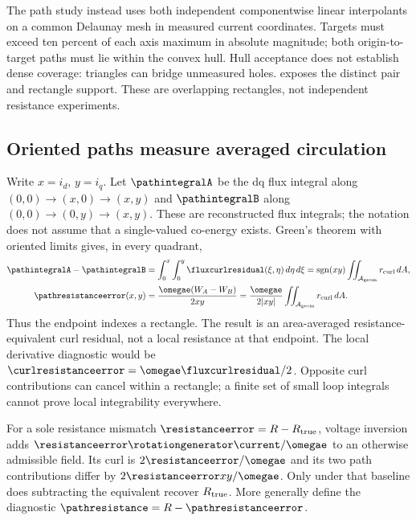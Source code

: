 The path study instead uses both independent componentwise linear
interpolants on a common Delaunay mesh in measured current coordinates.
Targets must exceed ten percent of each axis maximum in absolute magnitude;
both origin-to-target paths must lie within the convex hull. Hull acceptance
does not establish dense coverage: triangles can bridge unmeasured holes.
 exposes the distinct pair and rectangle support.
These are overlapping rectangles, not independent resistance experiments.
\begin{table}[tb]
\centering\small

\caption{Unchanged audit support. Speed $n$ is in rpm and rotor reference in
$^\circ$C. Skips count hull failures after the axis threshold: 2871 candidate
targets per 2000-rpm slice and 69 per multi-speed slice. OP means
operating-index groups, not raw samples.}
\label{tab:audit-support}
\end{table}

\subsection{Oriented paths measure averaged circulation}
Write $x=i_d$, $y=i_q$. Let $\pathintegralA$ be the dq flux integral along
$(0,0)\to(x,0)\to(x,y)$ and $\pathintegralB$ along
$(0,0)\to(0,y)\to(x,y)$. These are reconstructed flux integrals; the notation
does not assume that a single-valued co-energy exists. Green's theorem with
oriented limits gives, in every quadrant,
\begin{align}
 \pathintegralA-\pathintegralB
 &=\int_0^x\int_0^y \fluxcurlresidual(\xi,\eta)\,d\eta\,d\xi
   =\operatorname{sgn}(xy)\iint_{\mathcal A_{\rm geom}}
     r_{\rm curl}\,dA,\label{eq:oriented-real-path}\\
 \pathresistanceerror(x,y)
 &=\frac{\omegae(W_A-W_B)}{2xy}
   =\frac{\omegae}{2|xy|}\iint_{\mathcal A_{\rm geom}}
     r_{\rm curl}\,dA.\label{eq:rectangle-equivalent}
\end{align}
Thus the endpoint indexes a rectangle. The result is an area-averaged
resistance-equivalent curl residual, not a local resistance at that endpoint.
The local derivative diagnostic would be
$\curlresistanceerror=\omegae\fluxcurlresidual/2$.
Opposite curl contributions can cancel within a rectangle; a finite set of
small loop integrals cannot prove local integrability everywhere.

For a sole resistance mismatch $\resistanceerror=R-R_{\rm true}$, voltage
inversion adds $\resistanceerror\rotationgenerator\current/\omegae$ to an
otherwise admissible field. Its curl is $2\resistanceerror/\omegae$ and
its two path contributions differ by $2\resistanceerror xy/\omegae$.
Only under that baseline does subtracting the equivalent recover
$R_{\rm true}$. More generally define the diagnostic
$\pathresistance=R-\pathresistanceerror$.

